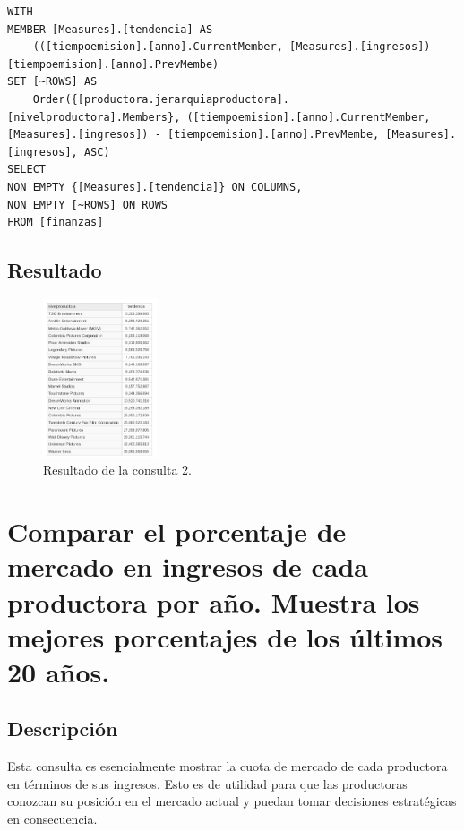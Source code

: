 \documentclass[11pt]{opticajnl}
\begin{document}
\begin{lstlisting}[style=terminal]
WITH
MEMBER [Measures].[tendencia] AS
	(([tiempoemision].[anno].CurrentMember, [Measures].[ingresos]) - [tiempoemision].[anno].PrevMembe)
SET [~ROWS] AS
	Order({[productora.jerarquiaproductora].[nivelproductora].Members}, ([tiempoemision].[anno].CurrentMember, [Measures].[ingresos]) - [tiempoemision].[anno].PrevMembe, [Measures].[ingresos], ASC)
SELECT
NON EMPTY {[Measures].[tendencia]} ON COLUMNS,
NON EMPTY [~ROWS] ON ROWS
FROM [finanzas]
\end{lstlisting}

\subsection{Resultado}

\begin{figure}[h]
\centering
\includegraphics[width=0.3\textwidth]{fotos/con2.jpg}
\caption{Resultado de la consulta 2.}
\end{figure}

\newpage

\section{Comparar el porcentaje de mercado en ingresos de cada productora por año. Muestra los mejores porcentajes de los últimos 20 años.}

\subsection{Descripción}

Esta consulta es esencialmente mostrar la cuota de mercado de cada productora en términos de sus ingresos. Esto es de utilidad para que las productoras conozcan su posición en el mercado actual y puedan tomar decisiones estratégicas en consecuencia. \\
\end{document}
